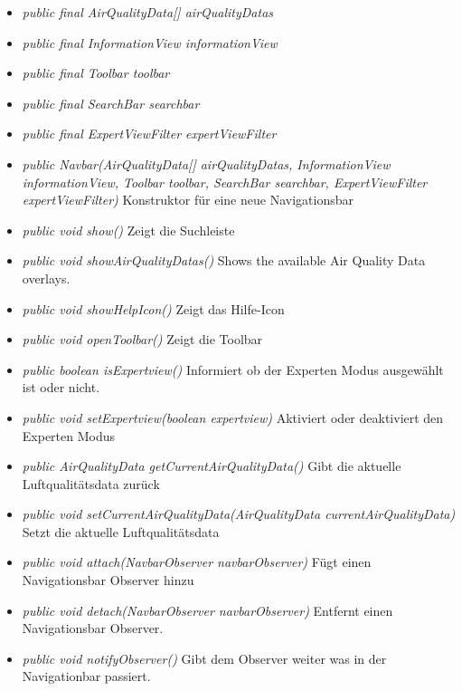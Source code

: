 \begin{itemize} [noitemsep]
    \item \emph{public final AirQualityData[] airQualityDatas}
    \item \emph{public final InformationView informationView}
    \item \emph{public final Toolbar toolbar}
    \item \emph{public final SearchBar searchbar}
    \item \emph{public final ExpertViewFilter expertViewFilter} 
    \item \emph{public Navbar(AirQualityData[] airQualityDatas, InformationView informationView, Toolbar toolbar, SearchBar searchbar, ExpertViewFilter expertViewFilter)} Konstruktor für eine neue Navigationsbar
    \item \emph{public void show()} Zeigt die Suchleiste
    \item \emph{public void showAirQualityDatas()} Shows the available Air Quality Data overlays.
    \item \emph{public void showHelpIcon()} Zeigt das Hilfe-Icon
    \item \emph{public void openToolbar()} Zeigt die Toolbar
    \item \emph{public boolean isExpertview()} Informiert ob der Experten Modus ausgewählt ist oder nicht.
    \item \emph{public void setExpertview(boolean expertview)} Aktiviert oder deaktiviert den Experten Modus
    \item \emph{public AirQualityData getCurrentAirQualityData()} Gibt die aktuelle Luftqualitätsdata zurück
    \item \emph{public void setCurrentAirQualityData(AirQualityData currentAirQualityData)} Setzt die aktuelle Luftqualitätsdata
    \item \emph{public void attach(NavbarObserver navbarObserver)} Fügt einen Navigationsbar Observer hinzu
    \item \emph{public void detach(NavbarObserver navbarObserver)} Entfernt einen Navigationsbar Observer.
    \item \emph{public void notifyObserver()} Gibt dem Observer weiter was in der Navigationbar passiert.
\end{itemize}

